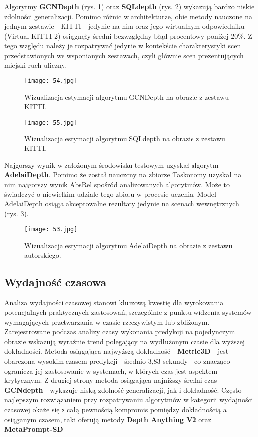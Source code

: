 Algorytmy \textbf{GCNDepth} (rys. \ref{fig:GCNDepth-KITTI}) oraz \textbf{SQLdepth} (rys. \ref{fig:SQLdepth-KITTI}) wykazują bardzo niskie zdolności generalizacji. Pomimo różnic w architekturze, obie metody nauczone na jednym zestawie - KITTI - jedynie na nim oraz jego wirtualnym odpowiedniku (Virtual KITTI 2) osiągnęły średni bezwzględny błąd procentowy poniżej 20\%. Z tego względu należy je rozpatrywać jedynie w kontekście charakterystyki scen przedstawionych we wsponianych zestawach, czyli głównie scen prezentujących miejski ruch uliczny.
\begin{figure}[H]
    \centering
    \texttt{[image: 54.jpg]}
    \caption{Wizualizacja estymacji algorytmu GCNDepth na obrazie z zestawu KITTI.}
    \label{fig:GCNDepth-KITTI}
\end{figure}
\begin{figure}[H]
    \centering
    \texttt{[image: 55.jpg]}
    \caption{Wizualizacja estymacji algorytmu SQLdepth na obrazie z zestawu KITTI.}
    \label{fig:SQLdepth-KITTI}
\end{figure}

Najgorszy wynik w założonym środowisku testowym uzyskał algorytm \textbf{AdelaiDepth}. Pomimo że został nauczony na zbiorze Taskonomy uzyskał na nim najgorszy wynik AbsRel spośród analizowanych algorytmów. Może to świadczyć o niewielkim udziale tego zbioru w procesie uczenia. Model AdelaiDepth osiąga akceptowalne rezultaty jedynie na scenach wewnętrznych (rys. \ref{fig:adelaidepth-stray}).
\begin{figure}[H]
    \centering
    \texttt{[image: 53.jpg]}
    \caption{Wizualizacja estymacji algorytmu AdelaiDepth na obrazie z zestawu autorskiego.}
    \label{fig:adelaidepth-stray}
\end{figure}

\subsection{Wydajność czasowa}
Analiza wydajności czasowej stanowi kluczową kwestię dla wyrokowania potencjalnych praktycznych zastosowań, szczególnie z punktu widzenia systemów wymagających przetwarzania w czasie rzeczywistym lub zbliżonym. Zarejestrowane podczas analizy czasy wykonania predykcji na pojedynczym obrazie wskazują wyraźnie trend polegający na wydłużonym czasie dla wyższej dokładności. Metoda osiągająca najwyższą dokładność - \textbf{Metric3D} - jest obarczona wysokim czasem predykcji - średnio 3,83 sekundy - co znacząco ogranicza jej zastosowanie w systemach, w których czas jest aspektem krytycznym. Z drugiej strony metoda osiągająca najniższy średni czas - \textbf{GCNdepth} - wykazuje niską zdolność generalizacji, jak i dokładność. Często najlepszym rozwiązaniem przy rozpatrywaniu algorytmów w kategorii wydajności czasowej okaże się z całą pewnością kompromis pomiędzy dokładnością a osiąganym czasem, taki oferują metody \textbf{Depth Anything V2} oraz \textbf{MetaPrompt-SD}.

